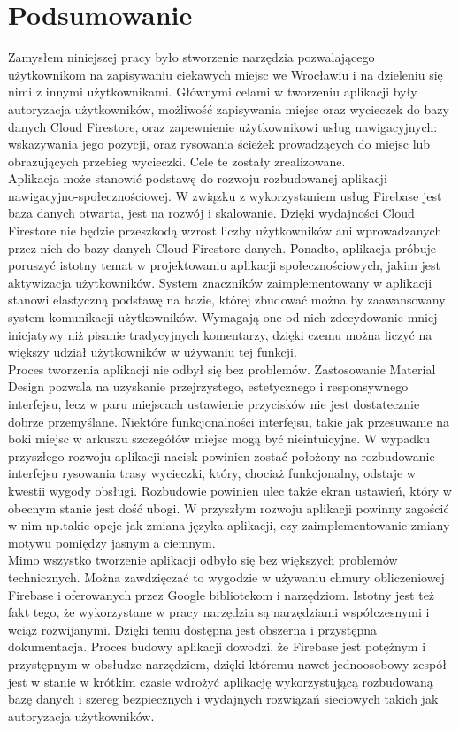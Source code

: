 \newpage
    \section{Podsumowanie}
    Zamysłem niniejszej pracy było stworzenie narzędzia pozwalającego użytkownikom na zapisywaniu ciekawych miejsc we Wrocławiu i na dzieleniu się nimi
    z innymi użytkownikami. Głównymi celami w tworzeniu aplikacji były autoryzacja użytkowników, możliwość zapisywania miejsc oraz wycieczek do bazy danych Cloud Firestore,
    oraz zapewnienie użytkownikowi usług nawigacyjnych: wskazywania jego pozycji, oraz rysowania ścieżek prowadzących do miejsc lub obrazujących przebieg wycieczki. Cele 
    te zostały zrealizowane. \\ 

    Aplikacja może stanowić podstawę do rozwoju rozbudowanej aplikacji nawigacyjno-społecznościowej. W związku z wykorzystaniem usług Firebase jest baza danych otwarta, jest na rozwój
    i skalowanie. Dzięki wydajności Cloud Firestore nie będzie przeszkodą wzrost liczby użytkowników ani wprowadzanych przez nich do bazy danych Cloud Firestore danych.
    Ponadto, aplikacja próbuje poruszyć istotny temat w projektowaniu aplikacji społecznościowych, jakim jest aktywizacja użytkowników. System znaczników zaimplementowany
    w aplikacji stanowi elastyczną podstawę na bazie, której zbudować można by zaawansowany system komunikacji użytkowników. Wymagają one od nich zdecydowanie mniej inicjatywy
    niż pisanie tradycyjnych komentarzy, dzięki czemu można liczyć na większy udział użytkowników w używaniu tej funkcji. \\

    Proces tworzenia aplikacji nie odbył się bez problemów. Zastosowanie Material Design pozwala na uzyskanie przejrzystego, estetycznego i responsywnego interfejsu, lecz w 
    paru miejscach ustawienie przycisków nie jest dostatecznie dobrze przemyślane. Niektóre funkcjonalności interfejsu, takie jak przesuwanie na boki miejsc w arkuszu szczegółów miejsc
    mogą być nieintuicyjne. W wypadku przyszłego rozwoju aplikacji nacisk powinien zostać położony na rozbudowanie interfejsu rysowania trasy wycieczki, który, chociaż funkcjonalny,
    odstaje w kwestii wygody obsługi. Rozbudowie powinien ulec także ekran ustawień, który w obecnym stanie jest dość ubogi. W przyszłym rozwoju aplikacji powinny zagościć w nim np.\@ takie opcje jak
    zmiana języka aplikacji, czy zaimplementowanie zmiany motywu pomiędzy jasnym a ciemnym. \\

    Mimo wszystko tworzenie aplikacji odbyło się bez większych problemów technicznych. Można zawdzięczać to wygodzie w używaniu chmury obliczeniowej Firebase i oferowanych przez Google
    bibliotekom i narzędziom. Istotny jest też fakt tego, że wykorzystane w pracy narzędzia są narzędziami współczesnymi i wciąż rozwijanymi. Dzięki temu dostępna jest obszerna i przystępna dokumentacja.
    Proces budowy aplikacji dowodzi, że Firebase jest potężnym i przystępnym w obsłudze narzędziem, dzięki któremu nawet jednoosobowy zespół jest w stanie w krótkim czasie wdrożyć aplikację
    wykorzystującą rozbudowaną bazę danych i szereg bezpiecznych i wydajnych rozwiązań sieciowych takich jak autoryzacja użytkowników.